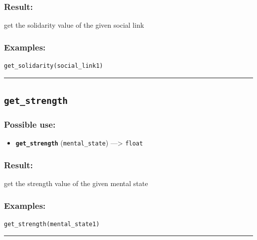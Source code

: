 \documentclass[]{book}
\providecommand{\tightlist}{%
  \setlength{\itemsep}{0pt}\setlength{\parskip}{0pt}}
\theoremstyle{definition}
\theoremstyle{definition}
\theoremstyle{definition}
\theoremstyle{remark}
\begin{document}
\subsubsection{Result:}\label{result-221}

get the solidarity value of the given social link

\subsubsection{Examples:}\label{examples-174}

\begin{verbatim}
get_solidarity(social_link1) 
\end{verbatim}

\begin{center}\rule{0.5\linewidth}{\linethickness}\end{center}

\subsection{\texorpdfstring{\texttt{get\_strength}}{get\_strength}}\label{get_strength}

\subsubsection{Possible use:}\label{possible-use-228}

\begin{itemize}
\tightlist
\item
  \textbf{\texttt{get\_strength}} (\texttt{mental\_state})
  ---\textgreater{} \texttt{float}
\end{itemize}

\subsubsection{Result:}\label{result-222}

get the strength value of the given mental state

\subsubsection{Examples:}\label{examples-175}

\begin{verbatim}
get_strength(mental_state1) 
\end{verbatim}

\begin{center}\rule{0.5\linewidth}{\linethickness}\end{center}
\end{document}

